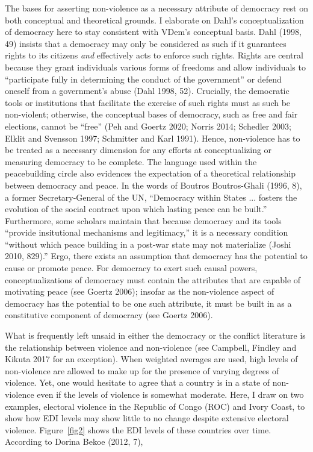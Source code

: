 \documentclass [11pt]{article}
\begin{document}
The bases for asserting non-violence as a necessary attribute of democracy rest on both conceptual and theoretical grounds. I elaborate on Dahl's conceptualization of democracy here to stay consistent with VDem's conceptual basis. Dahl (1998, 49) insists that a democracy may only be considered as such if it guarantees rights to its citizens \emph{and} effectively acts to enforce such rights. Rights are central because they grant individuals various forms of freedoms and allow individuals to ``participate fully in determining the conduct of the government'' or defend oneself from a government's abuse (Dahl 1998, 52). Crucially, the democratic tools or institutions that facilitate the exercise of such rights must as such be non-violent; otherwise, the conceptual bases of democracy, such as free and fair elections, cannot be ``free'' (Peh and Goertz 2020; Norris 2014; Schedler 2003; Elklit and Svensson 1997; Schmitter and Karl 1991). Hence, non-violence has to be treated as a necessary dimension for any efforts at conceptualizing or measuring democracy to be complete. The language used within the peacebuilding circle also evidences the expectation of a theoretical relationship between democracy and peace. In the words of Boutros Boutros-Ghali (1996, 8), a former Secretary-General of the UN, ``Democracy within States ... fosters the evolution of the social contract upon which lasting peace can be built.'' Furthermore, some scholars maintain that because democracy and its tools ``provide insitutional mechanisms and legitimacy,'' it is a necessary condition ``without which peace building in a post-war state may not materialize (Joshi 2010, 829).'' Ergo, there exists an assumption that democracy has the potential to cause or promote peace. For democracy to exert such causal powers, conceptualizations of democracy must contain the attributes that are capable of motivating peace (see Goertz 2006); insofar as the non-violence aspect of democracy has the potential to be one such attribute, it must be built in as a constitutive component of democracy (see Goertz 2006).

What is frequently left unsaid in either the democracy or the conflict literature is the relationship between violence and non-violence (see Campbell, Findley and Kikuta 2017 for an exception). When weighted averages are used, high levels of non-violence are allowed to make up for the presence of varying degrees of violence. Yet, one would hesitate to agree that a country is in a state of non-violence even if the levels of violence is somewhat moderate. Here, I draw on two examples, electoral violence in the Republic of Congo (ROC) and Ivory Coast, to show how EDI levels may show little to no change despite extensive electoral violence. Figure~\ref{fig2} shows the EDI levels of these countries over time. According to Dorina Bekoe (2012, 7),
\end{document}
